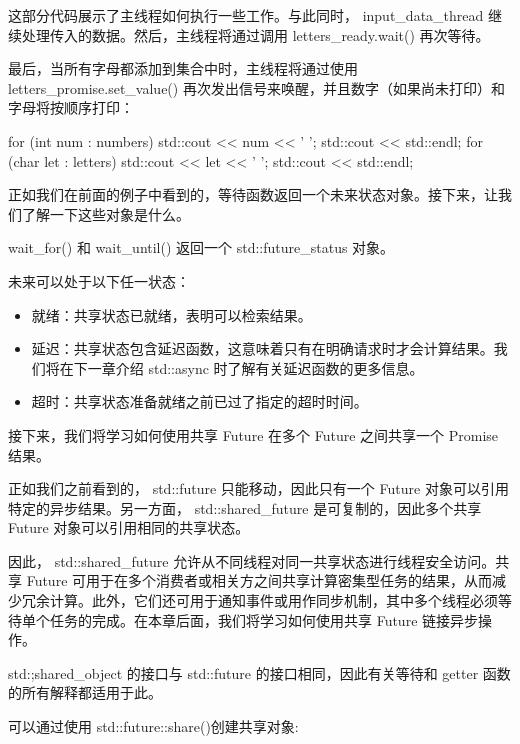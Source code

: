 这部分代码展示了主线程如何执行一些工作。与此同时， input\_data\_thread 继续处理传入的数据。然后，主线程将通过调用 letters\_ready.wait() 再次等待。

最后，当所有字母都添加到集合中时，主线程将通过使用 letters\_promise.set\_value() 再次发出信号来唤醒，并且数字（如果尚未打印）和字母将按顺序打印：

\begin{cpp}
for (int num : numbers) std::cout << num << ' ';
std::cout << std::endl;
for (char let : letters) std::cout << let << ' ';
std::cout << std::endl;
\end{cpp}

正如我们在前面的例子中看到的，等待函数返回一个未来状态对象。接下来，让我们了解一下这些对象是什么。


wait\_for() 和 wait\_until() 返回一个 std::future\_status 对象。

未来可以处于以下任一状态：

\begin{itemize}
\item
就绪：共享状态已就绪，表明可以检索结果。

\item
延迟：共享状态包含延迟函数，这意味着只有在明确请求时才会计算结果。我们将在下一章介绍 std::async 时了解有关延迟函数的更多信息。

\item
超时：共享状态准备就绪之前已过了指定的超时时间。
\end{itemize}

接下来，我们将学习如何使用共享 Future 在多个 Future 之间共享一个 Promise 结果。


正如我们之前看到的， std::future 只能移动，因此只有一个 Future 对象可以引用特定的异步结果。另一方面， std::shared\_future 是可复制的，因此多个共享 Future 对象可以引用相同的共享状态。

因此， std::shared\_future 允许从不同线程对同一共享状态进行线程安全访问。共享 Future 可用于在多个消费者或相关方之间共享计算密集型任务的结果，从而减少冗余计算。此外，它们还可用于通知事件或用作同步机制，其中多个线程必须等待单个任务的完成。在本章后面，我们将学习如何使用共享 Future 链接异步操作。

std:;shared\_object 的接口与 std::future 的接口相同，因此有关等待和 getter 函数的所有解释都适用于此。

可以通过使用 std::future::share()创建共享对象:

